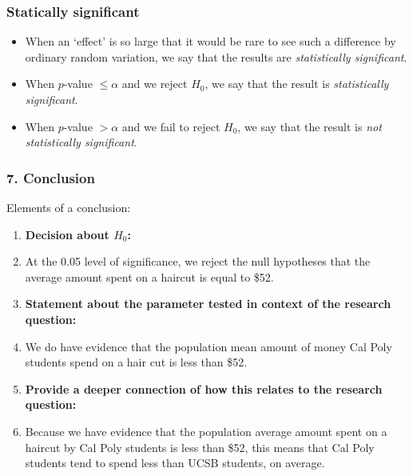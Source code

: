 \begin{frame}
\frametitle{Statically significant}
\begin{itemize}
    \item
    When an `effect' is so large that it would be rare to see such a difference by ordinary random variation, we say that the results are \emph{statistically significant}.
    \item
    When $p$-value $\leq \alpha$ and we reject $H_0$, we say that the result is \emph{statistically significant}.
    \item
    When $p$-value $> \alpha$ and we fail to reject $H_0$, we say that the result is \emph{not statistically significant}.
\end{itemize}
\vskip5pt
\begin{center}
\end{center}
\end{frame}

\begin{frame}
\frametitle{7. Conclusion}
Elements of a conclusion:
\begin{enumerate}
    \item \textbf{Decision about $H_0$:}
    \item[] At the 0.05 level of significance, we reject the null hypotheses that the average amount spent on a haircut is equal to \$52.
    \item \textbf{Statement about the parameter tested in context of the research question:}
    \item[] We do have evidence that the population mean amount of money Cal Poly students spend on a hair cut is less than \$52.
    \item \textbf{Provide a deeper connection of how this relates to the research question:}
    \item[]  Because we have evidence that the population average amount spent on a haircut by Cal Poly students is less than \$52, this means that Cal Poly students tend to spend less than UCSB students, on average.
\end{enumerate}
\end{frame}

